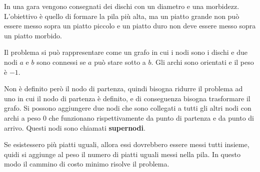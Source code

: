 \documentclass[a4paper]{article}
\begin{document}
\begin{exercise}
  In una gara vengono consegnati dei dischi con un diametro e una morbidezz.
  L'obiettivo è quello di formare la pila più alta, ma un piatto grande non può essere
  messo sopra un piatto piccolo e un piatto duro non deve essere messo sopra un piatto
  morbido.

  \vspace{1em}
  \noindent
  Il problema si può rappresentare come un grafo in cui i nodi sono i dischi e due
  nodi \( a \) e \( b \) sono connessi se \( a \) può stare sotto a \( b \). Gli
  archi sono orientati e il peso è \( -1 \).

  \vspace{1em}
  \noindent
  Non è definito però il nodo di partenza, quindi bisogna ridurre il problema ad uno
  in cui il nodo di partenza è definito, e di conseguenza bisogna trasformare il grafo.
  Si possono aggiungere due nodi che sono collegati a tutti gli altri nodi con archi
  a peso 0 che funzionano rispettivamente da punto di partenza e da punto di arrivo.
  Questi nodi sono chiamati \textbf{supernodi}.

  \vspace{1em}
  \noindent
  Se esistessero più piatti uguali, allora essi dovrebbero essere messi tutti insieme,
  quidi si aggiunge al peso il numero di piatti uguali messi nella pila. In questo
  modo il cammino di costo minimo risolve il problema.
\end{exercise}
\end{document}
